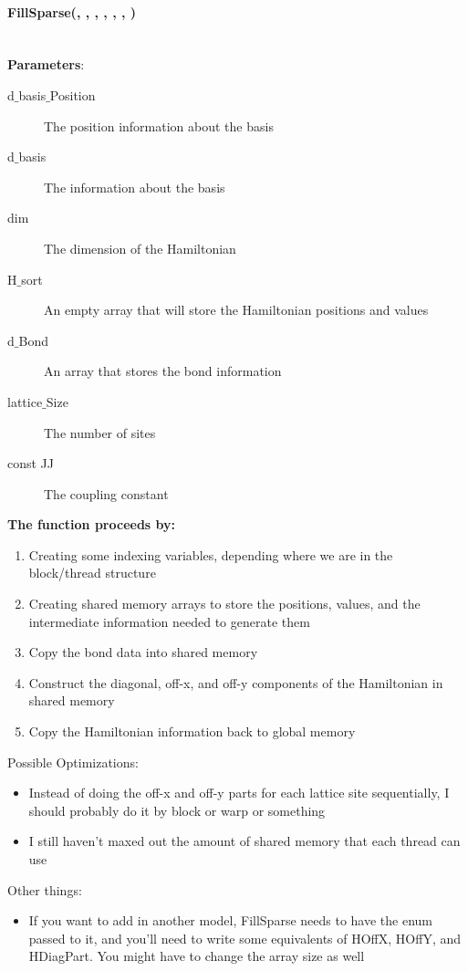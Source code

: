 \documentclass{article}
\begin{document}
{\paragraph{\cudaglobal \void FillSparse(\ptrint , \ptrint , \int, \hamstruct, \int , \int , \const \double ) \\ \\ }
\noindent\textbf{Parameters}:
\begin{description}
\item[\ptrint d$\_$basis$\_$Position] The position information about the basis
\item[\ptrint d$\_$basis] The information about the basis
\item[\long dim] The dimension of the Hamiltonian
\item[\cuDoubleComplex H$\_$sort] An empty array that will store the Hamiltonian positions and values
\item[\int d$\_$Bond] An array that stores the bond information
\item[\int lattice$\_$Size] The number of sites
\item[const \double JJ] The coupling constant
\end{description}

\noindent\textbf{The function proceeds by:}
\begin{enumerate}
\item{Creating some indexing variables, depending where we are in the block/thread structure}
\item{Creating shared memory arrays to store the positions, values, and the intermediate information needed to generate them}
\item{Copy the bond data into shared memory}
\item{Construct the diagonal, off-x, and off-y components of the Hamiltonian in shared memory}
\item{Copy the Hamiltonian information back to global memory}
\end{enumerate}

Possible Optimizations:
\begin{itemize}
\item{Instead of doing the off-x and off-y parts for each lattice site sequentially, I should probably do it by block or warp or something}
\item{I still haven't maxed out the amount of shared memory that each thread can use}
\end{itemize}

Other things:
\begin{itemize}
\item{If you want to add in another model, FillSparse needs to have the enum passed to it, and you'll need to write some equivalents of HOffX, HOffY, and HDiagPart. You might have to change the array size as well}
\end{itemize}

}
\end{document}
